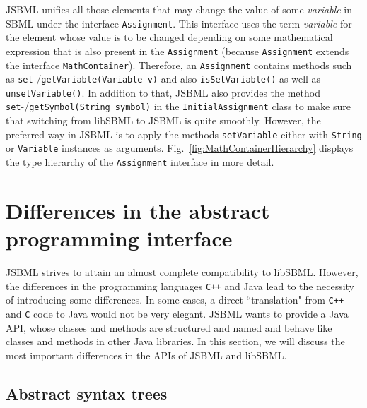 \documentclass[
  BCOR12mm,
  letterpaper,
  11pt,
  headsepline,
  pointlessnumbers,
  tablecaptionabove,
  onelinecaption,
  headinclude,
  appendixprefix,
  idxtotoc,
  bibtotoc,
  twoside,
  titlepage
]{scrartcl}
\begin{document}
JSBML unifies all those elements that may
change the value of some \emph{variable} in SBML
\citep{M.Hucka03012003} under the interface \texttt{Assignment}. This interface
uses the term \emph{variable} for the element whose value is to be changed
depending on some mathematical expression that is also present in the
\texttt{Assignment} (because \texttt{Assignment} extends the interface
\texttt{MathContainer}). Therefore,
an \texttt{Assignment} contains methods such as
\texttt{set}-/\texttt{getVariable(Variable v)} and also \texttt{isSetVariable()}
as well as \texttt{unsetVariable()}. In addition to that, JSBML also provides
the method \texttt{set}-/\texttt{getSymbol(String symbol)} in the
\texttt{InitialAssignment}
class to make sure that switching from libSBML
to JSBML is quite smoothly.
However, the preferred way in JSBML is to apply
the methods \texttt{setVariable} either with \texttt{String}
 or \texttt{Variable} instances as arguments.
Fig.~\vref{fig:MathContainerHierarchy} displays the type hierarchy of the
\texttt{Assignment} interface in more detail.



\section{Differences in the abstract programming interface}

JSBML strives to attain an almost complete compatibility to libSBML. However,
the differences in the programming languages \texttt{C++}
and Java\texttrademark{} lead to the necessity of introducing some differences.
In some cases, a direct ``translation" from \texttt{C++} and \texttt{C} code to
Java would not be very elegant. JSBML wants to provide a Java
API, whose classes and methods are
structured and named and behave like classes and methods in other Java
libraries. In this section, we will discuss the most important differences in
the APIs of JSBML and
libSBML.


\subsection{Abstract syntax trees}
\end{document}
